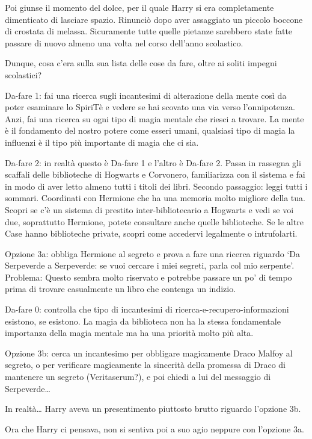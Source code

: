 Poi giunse il momento del dolce, per il quale Harry si era completamente dimenticato di lasciare spazio. Rinunciò dopo aver assaggiato un piccolo boccone di crostata di melassa. Sicuramente tutte quelle pietanze sarebbero state fatte passare di nuovo almeno una volta nel corso dell’anno scolastico.

Dunque, cosa c’era sulla sua lista delle cose da fare, oltre ai soliti impegni scolastici?

Da-fare 1: fai una ricerca sugli incantesimi di alterazione della mente così da poter esaminare lo SpiriTè e vedere se hai scovato una via verso l’onnipotenza. Anzi, fai una ricerca su ogni tipo di magia mentale che riesci a trovare. La mente è il fondamento del nostro potere come esseri umani, qualsiasi tipo di magia la influenzi è il tipo più importante di magia che ci sia.

Da-fare 2: in realtà questo è Da-fare 1 e l’altro è Da-fare 2. Passa in rassegna gli scaffali delle biblioteche di Hogwarts e Corvonero, familiarizza con il sistema e fai in modo di aver letto almeno tutti i titoli dei libri. Secondo passaggio: leggi tutti i sommari. Coordinati con Hermione che ha una memoria molto migliore della tua. Scopri se c’è un sistema di prestito inter-bibliotecario a Hogwarts e vedi se voi due, soprattutto Hermione, potete consultare anche quelle biblioteche. Se le altre Case hanno biblioteche private, scopri come accedervi legalmente o intrufolarti.

Opzione 3a: obbliga Hermione al segreto e prova a fare una ricerca riguardo ‘Da Serpeverde a Serpeverde: se vuoi cercare i miei segreti, parla col mio serpente’. Problema: Questo sembra molto riservato e potrebbe passare un po’ di tempo prima di trovare casualmente un libro che contenga un indizio.

Da-fare 0: controlla che tipo di incantesimi di ricerca-e-recupero-informazioni esistono, se esistono. La magia da biblioteca non ha la stessa fondamentale importanza della magia mentale ma ha una priorità molto più alta.

Opzione 3b: cerca un incantesimo per obbligare magicamente Draco Malfoy al segreto, o per verificare magicamente la sincerità della promessa di Draco di mantenere un segreto (Veritaserum?), e poi chiedi a lui del messaggio di Serpeverde…

In realtà… Harry aveva un presentimento piuttosto brutto riguardo l’opzione 3b.

Ora che Harry ci pensava, non si sentiva poi a suo agio neppure con l’opzione 3a.

